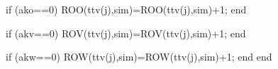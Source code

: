                                                           if (ako==0)
                                                             ROO(ttv(j),sim)=ROO(ttv(j),sim)+1;
                                                          end
                                                          
                                                          if (akv==0)
                                                             ROV(ttv(j),sim)=ROV(ttv(j),sim)+1;
                                                          end
                                                          
                                                          if (akw==0)
                                                             ROW(ttv(j),sim)=ROW(ttv(j),sim)+1;
                                                          end
                                                    end
                                                     
